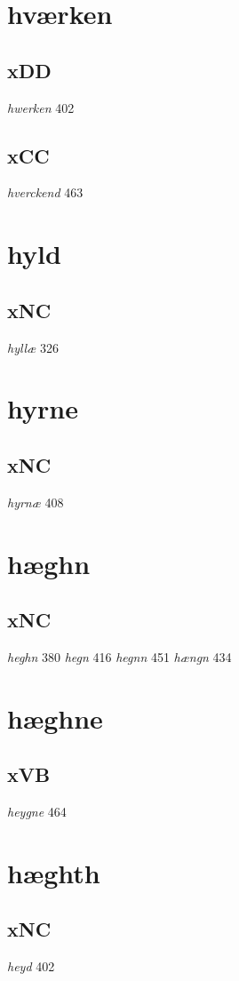 \documentclass[a4paper,twocolumn]{article}
\begin{document}
\section{hværken}
\label{sec:orgbeee627}
\subsection{xDD}
\label{sec:org495cd45}
\emph{hwerken} 402 
\subsection{xCC}
\label{sec:org6e3a220}
\emph{hverckend} 463 
\section{hyld}
\label{sec:orgce5e857}
\subsection{xNC}
\label{sec:org39ba2fc}
\emph{hyllæ} 326 
\section{hyrne}
\label{sec:org4c0f40e}
\subsection{xNC}
\label{sec:org8bab2ce}
\emph{hyrnæ} 408 
\section{hæghn}
\label{sec:org40f9738}
\subsection{xNC}
\label{sec:org5f34b70}
\emph{heghn} 380 \emph{hegn} 416 \emph{hegnn} 451 \emph{hængn} 434 
\section{hæghne}
\label{sec:org00282f7}
\subsection{xVB}
\label{sec:org5714ce5}
\emph{heygne} 464 
\section{hæghth}
\label{sec:orgcada241}
\subsection{xNC}
\label{sec:org1c6e11c}
\emph{heyd} 402 
\end{document}
